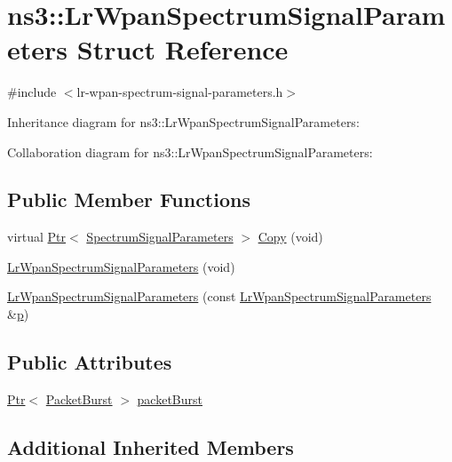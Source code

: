 \hypertarget{structns3_1_1LrWpanSpectrumSignalParameters}{}\section{ns3\+:\+:Lr\+Wpan\+Spectrum\+Signal\+Parameters Struct Reference}
\label{structns3_1_1LrWpanSpectrumSignalParameters}


{\ttfamily \#include $<$lr-\/wpan-\/spectrum-\/signal-\/parameters.\+h$>$}



Inheritance diagram for ns3\+:\+:Lr\+Wpan\+Spectrum\+Signal\+Parameters\+:


Collaboration diagram for ns3\+:\+:Lr\+Wpan\+Spectrum\+Signal\+Parameters\+:
\subsection*{Public Member Functions}
\begin{DoxyCompactItemize}
\item 
virtual \hyperlink{classns3_1_1Ptr}{Ptr}$<$ \hyperlink{structns3_1_1SpectrumSignalParameters}{Spectrum\+Signal\+Parameters} $>$ \hyperlink{structns3_1_1LrWpanSpectrumSignalParameters_a4681b88cdd3971b324c27d58368c31ce}{Copy} (void)
\item 
\hyperlink{structns3_1_1LrWpanSpectrumSignalParameters_afa2f6dd400d24ed0b6b7a608f52f9c32}{Lr\+Wpan\+Spectrum\+Signal\+Parameters} (void)
\item 
\hyperlink{structns3_1_1LrWpanSpectrumSignalParameters_ad526df97f0d4f7a3b74dc91c3624c340}{Lr\+Wpan\+Spectrum\+Signal\+Parameters} (const \hyperlink{structns3_1_1LrWpanSpectrumSignalParameters}{Lr\+Wpan\+Spectrum\+Signal\+Parameters} \&\hyperlink{lte__link__budget__x2__handover__measures_8m_ac9de518908a968428863f829398a4e62}{p})
\end{DoxyCompactItemize}
\subsection*{Public Attributes}
\begin{DoxyCompactItemize}
\item 
\hyperlink{classns3_1_1Ptr}{Ptr}$<$ \hyperlink{classns3_1_1PacketBurst}{Packet\+Burst} $>$ \hyperlink{structns3_1_1LrWpanSpectrumSignalParameters_a70de4d89e2d9bc52cbd5dca0197cbb95}{packet\+Burst}
\end{DoxyCompactItemize}
\subsection*{Additional Inherited Members}


